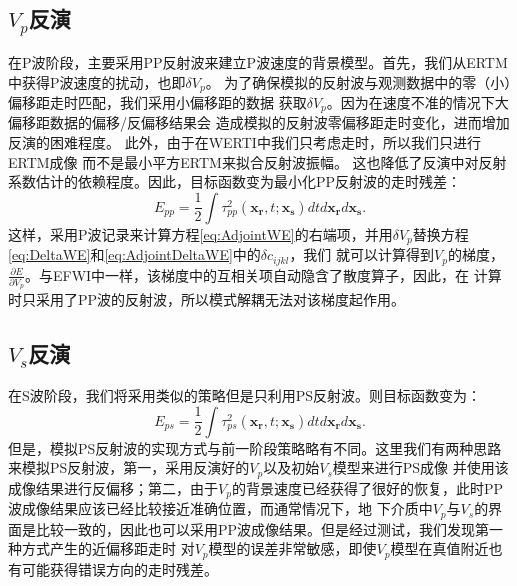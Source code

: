 \subsection{$V_p$反演}
在P波阶段，主要采用PP反射波来建立P波速度的背景模型。首先，我们从ERTM中获得P波速度的扰动，也即$\delta V_p$。
为了确保模拟的反射波与观测数据中的零（小）偏移距走时匹配，我们采用小偏移距的数据
获取$\delta V_p$。因为在速度不准的情况下大偏移距数据的偏移/反偏移结果会
造成模拟的反射波零偏移距走时变化，进而增加反演的困难程度。
此外，由于在WERTI中我们只考虑走时，所以我们只进行ERTM成像
而不是最小平方ERTM来拟合反射波振幅。
这也降低了反演中对反射系数估计的依赖程度。因此，目标函数变为最小化PP反射波的走时残差：
\begin{equation}
    E_{pp}=\frac{1}{2}\int\tau^2_{pp}(\mathbf{x_r},t;\mathbf{x_s})dtd\mathbf{x_r}d\mathbf{x_s}.
    \label{eq:ObjectivefunctionPP} 
\end{equation}
这样，采用P波记录来计算方程\eqref{eq:AdjointWE}的右端项，并用$\delta V_p$替换方程\eqref{eq:DeltaWE}和\eqref{eq:AdjointDeltaWE}中的$\delta c_{ijkl}$，我们
就可以计算得到$V_p$的梯度， $\frac{\partial E}{\partial V_p}$。与EFWI中一样，该梯度中的互相关项自动隐含了散度算子，因此，在
计算时只采用了PP波的反射波，所以模式解耦无法对该梯度起作用。

\subsection{$V_s$反演}
在S波阶段，我们将采用类似的策略但是只利用PS反射波。则目标函数变为：
\begin{equation}
    E_{ps}=\frac{1}{2}\int\tau^2_{ps}(\mathbf{x_r},t;\mathbf{x_s})dtd\mathbf{x_r}d\mathbf{x_s}.
    \label{eq:ObjectivefunctionPS} 
\end{equation}
但是，模拟PS反射波的实现方式与前一阶段策略略有不同。这里我们有两种思路来模拟PS反射波，第一，采用反演好的$V_p$以及初始$V_s$模型来进行PS成像
并使用该成像结果进行反偏移；第二，由于$V_p$的背景速度已经获得了很好的恢复，此时PP波成像结果应该已经比较接近准确位置，而通常情况下，地
下介质中$V_p$与$V_s$的界面是比较一致的，因此也可以采用PP波成像结果。但是经过测试，我们发现第一种方式产生的近偏移距走时
对$V_p$模型的误差非常敏感，即使$V_p$模型在真值附近也有可能获得错误方向的走时残差。

